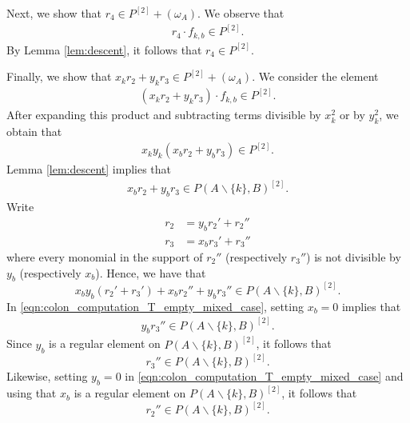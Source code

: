 \documentclass[12pt,a4paper]{amsart}
\theoremstyle{plain}
\theoremstyle{definition}
\theoremstyle{remark}
\let\setminus=\smallsetminus
\begin{document}
Next, we show that $r_{4} \in P^{[2]} + (\omega_{A})$. We observe that 
\begin{align*}
    r_{4} \cdot f_{k,b}  \in P^{[2]}.
\end{align*}
By Lemma \ref{lem:descent}, it follows that $r_{4} \in P^{[2]}$.

Finally, we show that $x_{k}r_{2} + y_{k} r_{3} \in P^{[2]} + (\omega_{A})$. We consider the element 
\begin{align*}
    (x_{k}r_{2} + y_{k} r_{3})\cdot f_{k,b} \in P^{[2]}.
\end{align*}
After expanding this product and subtracting terms divisible by $x_{k}^{2}$ or by $y_{k}^{2}$, we obtain that 
\begin{align*}
    x_{k}y_{k} (x_{b}r_{2} + y_{b}r_{3}) \in P^{[2]}.
\end{align*}
Lemma \ref{lem:descent} implies that 
\begin{align*}
    x_{b}r_{2} + y_{b}r_{3} \in P(A\setminus \{k\},B)^{[2]}.
\end{align*}
Write 
\begin{equation}
\label{eqn:colon_computation_T_empty_mixed_case_0}
\begin{aligned}
    r_{2} &= y_{b}r_{2}' + r_{2}'' \\
    r_{3} &= x_{b}r_{3}' + r_{3}''
\end{aligned}
\end{equation}
where every monomial in the support of $r_{2}''$ (respectively $r_{3}''$) is not divisible by $y_{b}$ (respectively $x_{b}$). Hence, we have that 
\begin{equation}
    \label{eqn:colon_computation_T_empty_mixed_case}
    x_{b}y_{b}(r_{2}' + r_{3}') + x_{b}r_{2}'' + y_{b}r_{3}'' \in P(A \setminus \{k\},B)^{[2]}.
\end{equation}
In  \eqref{eqn:colon_computation_T_empty_mixed_case}, setting $x_{b} = 0$ implies that 
\begin{align*}
    y_{b}r_{3}'' \in P(A\setminus \{k\},B)^{[2]}.
\end{align*}
Since $y_{b}$ is a regular element on $P(A\setminus \{k\},B)^{[2]}$, it follows that 
\begin{equation}
    \label{eqn:colon_computation_T_empty_mixed_case_2}
    r_{3}'' \in P(A\setminus \{k\},B)^{[2]}.
\end{equation}
Likewise, setting $y_{b} = 0$ in  \eqref{eqn:colon_computation_T_empty_mixed_case} and using that $x_{b}$ is a regular element on $P(A\setminus \{k\},B)^{[2]}$, it follows that 
\begin{equation}
    \label{eqn:colon_computation_T_empty_mixed_case_3}
    r_{2}'' \in P(A\setminus \{k\},B)^{[2]}.
\end{equation}
\end{document}
